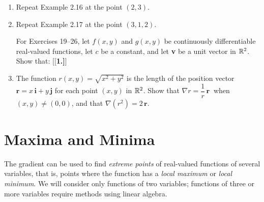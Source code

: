 \begin{enumerate}[\bfseries 1.]
  \item Repeat Example 2.16 at the point $(2,3)$.
  \item Repeat Example 2.17 at the point $(3,1,2)$.
\par\noindent For Exercises 19--26, let $f(x,y)$ and $g(x,y)$ be continuously differentiable
real-valued functions, let $c$ be a constant, and let \textbf{v} be a unit vector in $\mathbb{R}^{2}$. Show that:
[{[\bfseries 1.]}]
 \item The function $r(x,y) = \sqrt{x^2 + y^2}$ is the length of the position vector
  $\textbf{r}=x\,\textbf{i} + y\,\textbf{j}$ for each point $(x,y)$ in $\mathbb{R}^{2}$. Show that
  $\nabla r = \dfrac{1}{r}\,\textbf{r}~$ when $(x,y) \ne (0,0)$, and that $\nabla (r^2 ) = 2\,\textbf{r}$.
\end{enumerate}
\newpage
\section{Maxima and Minima}
The gradient can be used to find \emph{extreme points} of real-valued functions of several variables, that is,
points where the function has a \emph{local maximum} or \emph{local minimum}. We will consider only functions of two
variables; functions of three or more variables require methods using linear algebra.

